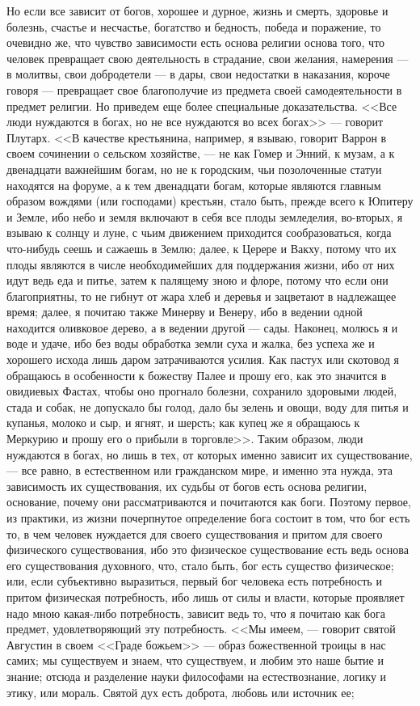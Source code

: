 \documentclass[12pt]{article}
\begin{document}
Но если все зависит от богов, хорошее и дурное, жизнь и смерть, здоровье и болезнь, счастье и несчастье, богатство и бедность, победа и поражение, то очевидно же, что чувство зависимости есть основа религии основа того, что человек превращает свою деятельность в страдание, свои желания, намерения --- в молитвы, свои добродетели --- в дары, свои недостатки в наказания, короче говоря --- превращает свое благополучие из предмета своей самодеятельности в предмет религии. Но приведем еще более специальные доказательства. <<Все люди нуждаются в богах, но не все нуждаются во всех богах>>  --- говорит Плутарх. <<В качестве крестьянина, например, я взываю, говорит Варрон в своем сочинении о сельском хозяйстве, --- не как Гомер и Энний, к музам, а к двенадцати важнейшим богам, но не к городским, чьи позолоченные статуи находятся на форуме, а к тем двенадцати богам, которые являются главным образом вождями (или господами) крестьян, стало быть, прежде всего к Юпитеру и Земле, ибо небо и земля включают в себя все плоды земледелия, во-вторых, я взываю к солнцу и луне, с чьим движением приходится сообразоваться, когда что-нибудь сеешь и сажаешь в Землю; далее, к Церере и Вакху, потому что их плоды являются в числе необходимейших для поддержания жизни, ибо от них идут ведь еда и питье, затем к палящему зною и флоре, потому что если они благоприятны, то не гибнут от жара хлеб и деревья и зацветают в надлежащее время; далее, я почитаю также Минерву и Венеру, ибо в ведении одной находится оливковое дерево, а в ведении другой --- сады. Наконец, молюсь я и воде и удаче, ибо без воды обработка земли суха и жалка, без успеха же и хорошего исхода лишь даром затрачиваются усилия. Как пастух или скотовод я обращаюсь в особенности к божеству Палее и прошу его, как это значится в овидиевых Фастах, чтобы оно прогнало болезни, сохранило здоровыми людей, стада и собак, не допускало бы голод, дало бы зелень и овощи, воду для питья и купанья, молоко и сыр, и ягнят, и шерсть; как купец же я обращаюсь к Меркурию и прошу его о прибыли в торговле>>. Таким образом, люди нуждаются в богах, но лишь в тех, от которых именно зависит их существование, --- все равно, в естественном или гражданском мире, и именно эта нужда, эта зависимость их существования, их судьбы от богов есть основа религии, основание, почему они рассматриваются и почитаются как боги. Поэтому первое, из практики, из жизни почерпнутое определение бога состоит в том, что бог есть то, в чем человек нуждается для своего существования и притом для своего физического существования, ибо это физическое существование есть ведь основа его существования духовного, что, стало быть, бог есть существо физическое; или, если субъективно выразиться, первый бог человека есть потребность и притом физическая потребность, ибо лишь от силы и власти, которые проявляет надо мною какая-либо потребность, зависит ведь то, что я почитаю как бога предмет, удовлетворяющий эту потребность. <<Мы имеем, --- говорит святой Августин в своем <<Граде божьем>>  --- образ божественной троицы в нас самих; мы существуем и знаем, что существуем, и любим это наше бытие и знание; отсюда и разделение науки философами на естествознание, логику и этику, или мораль. Святой дух есть доброта, любовь или источник ее; 
\end{document}
